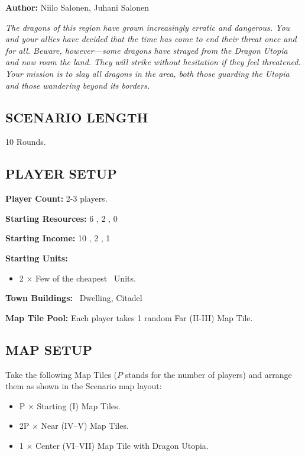 
\begin{multicols}{2}

\textbf{Author:} Niilo Salonen, Juhani Salonen

\textit{The dragons of this region have grown increasingly erratic and dangerous.
You and your allies have decided that the time has come to end their threat once and for all.
Beware, however—some dragons have strayed from the Dragon Utopia and now roam the land.
They will strike without hesitation if they feel threatened.
Your mission is to slay all dragons in the area, both those guarding the Utopia and those wandering beyond its borders.}  %

\subsection*{\MakeUppercase{Scenario Length}}
10 Rounds.

\subsection*{\MakeUppercase{Player Setup}}
\textbf{Player Count:} 2-3 players.

\textbf{Starting Resources:} 6 , 2 , 0 

\textbf{Starting Income:} 10 , 2 , 1 

\textbf{Starting Units:}

\begin{itemize}
  \item 2 × Few of the cheapest \bronze\ Units.
\end{itemize}

\textbf{Town Buildings:} \bronze\ Dwelling, Citadel

\textbf{Map Tile Pool:} Each player takes 1 random Far (II-III) Map Tile.

\subsection*{\MakeUppercase{Map Setup}}
Take the following Map Tiles ($P$ stands for the number of players) and arrange them as shown in the Scenario map layout:

\begin{itemize}
  \item P × Starting (I) Map Tiles.
  \item 2P × Near (IV–V) Map Tiles.
  \item 1 × Center (VI–VII) Map Tile with Dragon Utopia.
\end{itemize}


\end{multicols}
